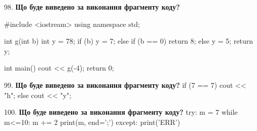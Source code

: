 \documentclass[11pt]{article}
\begin{document}
\par\vspace{5mm}
98. \textbf{Що буде виведено за виконання фрагменту коду?}

#include <iostream>
using namespace std;

int g(int b){
    int y = 78;
    if (b) 
        y = 7;
    else if (b == 0)
         return 8;
    else
         y = 5;
    return y;
}

int main(){
    cout << g(-4);
    return 0;
}

\par\vspace{5mm}
99. \textbf{Що буде виведено за виконання фрагменту коду?}
if (7 == 7)
    cout << "h";
else
    cout << "y";

\par\vspace{5mm}
100. \textbf{Що буде виведено за виконання фрагменту коду?}
try:
    m = 7
    while m<=10:
        m += 2
    print(m, end=';')
except:
    print('ERR')
\par\vspace{5mm}




































































































\newpage
\end{document}
